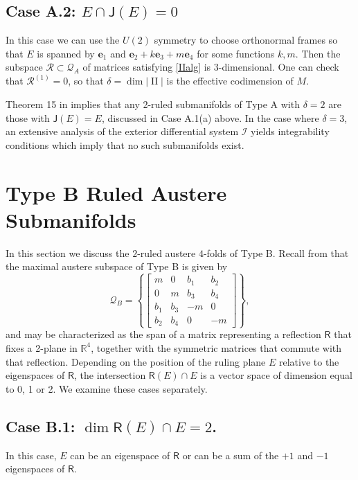 \documentclass[12pt,reqno]{amsart}
\theoremstyle{definition}
\theoremstyle{remark}
\begin{document}
\subsection*{Case A.2: $E \cap {\mathsf J}(E) = 0$}  In this case we can use the $U(2)$ symmetry
to choose orthonormal frames so that $E$ is spanned by ${\mathbf e}_1$ and ${\mathbf e}_2 + k{\mathbf e}_3 + m{\mathbf e}_4$
for some functions $k,m$.
Then the subspace ${\mathcal R} \subset {\mathcal Q}_A$ of matrices satisfying \eqref{IIalg} is 3-dimensional.
One can check that ${\mathcal R}^{(1)}=0$, so that $\delta = \dim |{\operatorname{II}} |$ is the effective codimension of $M$.

Theorem 15 in \cite{ayeaye} implies that any 2-ruled submanifolds of Type A with $\delta=2$
are those with ${\mathsf J}(E)=E$, discussed in Case A.1(a) above.
In the case where $\delta=3$,
an extensive analysis of the exterior differential system ${{\mathcal I}}$
yields integrability conditions which imply that no such submanifolds exist.

\section{Type B Ruled Austere Submanifolds}
In this section we discuss the $2$-ruled austere $4$-folds of Type B.
Recall from \cite{ayeaye} that the maximal austere subspace of Type B is given by
\begin{equation}\label{defofQB}
{\mathcal Q}_B = \left\{ \begin{bmatrix} m & 0 & b_1 & b_2 \\ 0 & m & b_3 & b_4 \\ b_1 & b_3 & -m &0 \\
b_2 & b_4 & 0  & -m \end{bmatrix} \right\},
\end{equation}
and may be characterized as the span of a matrix representing a reflection ${\mathsf R}$ that
fixes a 2-plane in ${\mathbb R}^4$, together with the symmetric matrices that commute with that reflection.
Depending on the position of the ruling plane $E$ relative to the eigenspaces of ${\mathsf R}$,
the intersection ${\mathsf R}(E)\cap E$ is a vector space of dimension equal to 0, 1 or 2. We examine these cases separately.

\medskip
\subsection*{Case B.1:  $\dim {\mathsf R}(E)\cap E=2$.}   In this case, $E$ can be an eigenspace of ${\mathsf R}$
or can be a sum of the $+1$ and $-1$ eigenspaces of ${\mathsf R}$.
\end{document}
